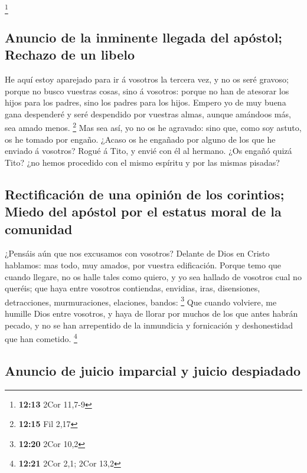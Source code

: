 \footnote{\textbf{12:13} 2Cor 11,7-9}

\hypertarget{anuncio-de-la-inminente-llegada-del-apuxf3stol-rechazo-de-un-libelo}{%
\subsection{Anuncio de la inminente llegada del apóstol; Rechazo de un
libelo}\label{anuncio-de-la-inminente-llegada-del-apuxf3stol-rechazo-de-un-libelo}}

 He aquí estoy aparejado para ir á vosotros la tercera
vez, y no os seré gravoso; porque no busco vuestras cosas, sino á
vosotros: porque no han de atesorar los hijos para los padres, sino los
padres para los hijos.  Empero yo de muy buena gana
despenderé y seré despendido por vuestras almas, aunque amándoos más,
sea amado menos. \footnote{\textbf{12:15} Fil 2,17}  Mas
sea así, yo no os he agravado: sino que, como soy astuto, os he tomado
por engaño.  ¿Acaso os he engañado por alguno de los que
he enviado á vosotros?  Rogué á Tito, y envié con él al
hermano. ¿Os engañó quizá Tito? ¿no hemos procedido con el mismo
espíritu y por las mismas pisadas?

\hypertarget{rectificaciuxf3n-de-una-opiniuxf3n-de-los-corintios-miedo-del-apuxf3stol-por-el-estatus-moral-de-la-comunidad}{%
\subsection{Rectificación de una opinión de los corintios; Miedo del
apóstol por el estatus moral de la
comunidad}\label{rectificaciuxf3n-de-una-opiniuxf3n-de-los-corintios-miedo-del-apuxf3stol-por-el-estatus-moral-de-la-comunidad}}

 ¿Pensáis aún que nos excusamos con vosotros? Delante de
Dios en Cristo hablamos: mas todo, muy amados, por vuestra edificación.
 Porque temo que cuando llegare, no os halle tales como
quiero, y yo sea hallado de vosotros cual no queréis; que haya entre
vosotros contiendas, envidias, iras, disensiones, detracciones,
murmuraciones, elaciones, bandos: \footnote{\textbf{12:20} 2Cor 10,2}
 Que cuando volviere, me humille Dios entre vosotros, y
haya de llorar por muchos de los que antes habrán pecado, y no se han
arrepentido de la inmundicia y fornicación y deshonestidad que han
cometido. \footnote{\textbf{12:21} 2Cor 2,1; 2Cor 13,2}

\hypertarget{anuncio-de-juicio-imparcial-y-juicio-despiadado}{%
\subsection{Anuncio de juicio imparcial y juicio
despiadado}\label{anuncio-de-juicio-imparcial-y-juicio-despiadado}}

